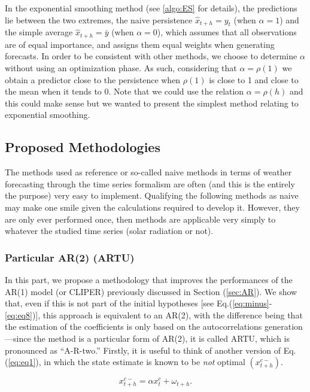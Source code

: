 In the exponential smoothing method (see \ref{algo:ES} for details), the predictions lie between the two extremes, the naive persistence $\widehat{x}_{t+h}=y_t$ (when $\alpha=1$) and the simple average $\widehat{x}_{t+h}=\bar{y}$ (when $\alpha=0$), which assumes that all observations are of equal importance, and assigns them equal weights when generating forecasts. In order to be consistent with other methods, we choose to determine $\alpha$ without using an optimization phase. As such, considering that $\alpha=\rho(1)$ we obtain a predictor close to the persistence when $\rho(1)$ is close to 1 and close to the mean when it tends to 0. Note that we could use the relation $ \alpha = \rho (h) $ and this could make sense but we wanted to present the simplest method relating to exponential smoothing.  

\subsection{Proposed Methodologies}
The methods used as reference or so-called naive methods in terms of weather forecasting through the time series formalism are often (and this is the entirely the purpose) very easy to implement. Qualifying the following methods as naive may make one smile given the calculations required to develop it. However, they are only ever performed once, then methods are applicable very simply to whatever the studied time series (solar radiation or not).


\subsubsection{\textnormal{Particular AR(2) } \textnormal{(ARTU)}}
\label{sec:method}
In this part, we propose a methodology that improves the performances of the AR(1) model (or CLIPER) previously discussed in Section (\ref{sec:AR}). We show that, even if this is not part of the initial hypotheses [see Eq.(\ref{eq:minus}-\ref{eq:eq8})], this approach is equivalent to an AR(2), with the difference being that the estimation of the coefficients is only based on the autocorrelations generation---since the method is a particular form of AR(2), it is called ARTU, which is pronounced as ``A-R-two.'' Firstly, it is useful to think of another version of Eq.(\ref{eq:eq1}), in which the state estimate is known to be \textit{not} optimal $({x^{c-}_{t+h}})$.

\begin{equation}
\label{eq:minus}
{x^{c-}_{t+h}}=\alpha x^c_t+\omega_{t+h}.
\end{equation}

